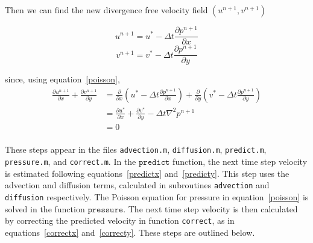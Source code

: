 \documentclass[12pt]{article}
\begin{document}
Then we can find the new divergence free velocity field $(u^{n+1},v^{n+1})$ 

\begin{equation}
u^{n+1}= u^* - \Delta t\frac{\partial p^{n+1}}{\partial x}
\label{correctx}
\end{equation}
\begin{equation}
v^{n+1}= v^* - \Delta t\frac{\partial p^{n+1}}{\partial y}
\label{correcty}
\end{equation}

since, using equation~\ref{poisson},
\begin{align*}
\frac{\partial  u^{n+1}}{\partial x} +  \frac{\partial  v^{n+1}}{\partial y}&= \frac{\partial}{\partial x}\left(u^* - \Delta t\frac{\partial p^{n+1}}{\partial x} \right) + \frac{\partial}{\partial y}\left(v^* - \Delta t\frac{\partial p^{n+1}}{\partial y} \right)\\
&= \frac{\partial u^*}{\partial x} + \frac{\partial v^*}{\partial y} - \Delta t\nabla^2p^{n+1} \\
&= 0 \\
\end{align*}

These steps appear in the files \texttt{advection.m}, \texttt{diffusion.m}, \texttt{predict.m}, \texttt{pressure.m}, and \texttt{correct.m}.  In the $\texttt{predict}$ function, the next time step velocity is estimated following equations~\ref{predictx} and~\ref{predicty}.  This step uses the advection and diffusion terms, calculated in subroutines \texttt{advection} and \texttt{diffusion} respectively.  The Poisson equation for pressure in equation~\ref{poisson} is solved in the function $\texttt{pressure}$.  The next time step velocity is then calculated by correcting the predicted velocity in function \texttt{correct}, as in equations~\ref{correctx} and~\ref{correcty}.  These steps are outlined below.
\end{document}
